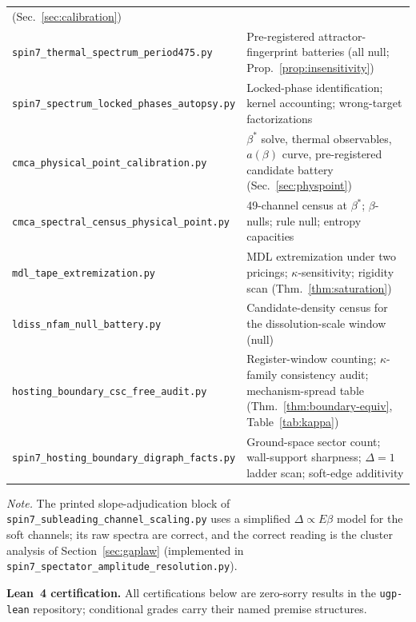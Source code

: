 \documentclass[11pt]{article}
\theoremstyle{remark}
\begin{document}
\begin{appendices}
\begin{center}
\begin{tabular}{@{}p{6.7cm}p{8.2cm}@{}}
    (Sec.~\ref{sec:calibration}) \\
\texttt{spin7\_thermal\_spectrum\_period475.py}
  & Pre-registered attractor-fingerprint batteries (all null;
    Prop.~\ref{prop:insensitivity}) \\
\texttt{spin7\_spectrum\_locked\_phases\_autopsy.py}
  & Locked-phase identification; kernel accounting; wrong-target
    factorizations \\
\texttt{cmca\_physical\_point\_calibration.py}
  & $\beta^*$ solve, thermal observables, $a(\beta)$ curve, pre-registered
    candidate battery (Sec.~\ref{sec:physpoint}) \\
\texttt{cmca\_spectral\_census\_physical\_point.py}
  & 49-channel census at $\beta^*$; $\beta$-nulls; rule null; entropy
    capacities \\
\texttt{mdl\_tape\_extremization.py}
  & MDL extremization under two pricings; $\kappa$-sensitivity; rigidity scan
    (Thm.~\ref{thm:saturation}) \\
\texttt{ldiss\_nfam\_null\_battery.py}
  & Candidate-density census for the dissolution-scale window (null) \\
\texttt{hosting\_boundary\_csc\_free\_audit.py}
  & Register-window counting; $\kappa$-family consistency audit;
    mechanism-spread table (Thm.~\ref{thm:boundary-equiv},
    Table~\ref{tab:kappa}) \\
\texttt{spin7\_hosting\_boundary\_digraph\_facts.py}
  & Ground-space sector count; wall-support sharpness; $\Delta = 1$ ladder
    scan; soft-edge additivity \\
\bottomrule
\end{tabular}
\end{center}

\noindent\emph{Note.} The printed slope-adjudication block of
\texttt{spin7\_subleading\_channel\_scaling.py} uses a simplified
$\Delta \propto E\beta$ model for the soft channels; its raw spectra are
correct, and the correct reading is the cluster analysis of
Section~\ref{sec:gaplaw} (implemented in
\texttt{spin7\_spectator\_amplitude\_resolution.py}).

\noindent\textbf{Lean~4 certification.}
All certifications below are zero-sorry results in the \texttt{ugp-lean}
repository; conditional grades carry their named premise structures.


\end{appendices}
\end{document}
